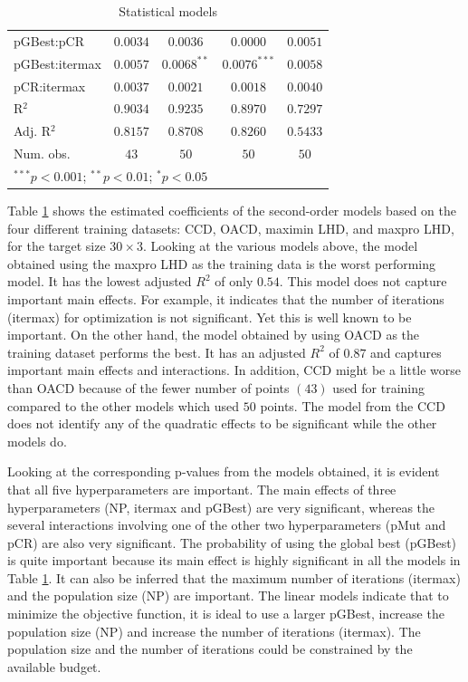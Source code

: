 \documentclass [PhD] {package/uclathes}
\begin{document}
\begin{table}
\begin{center}
\begin{tabular}{l c c c c}
pGBest:pCR     & $0.0034$        & $0.0036$        & $0.0000$        & $0.0051$        \\
pGBest:itermax & $0.0057$        & $0.0068^{**}$   & $0.0076^{***}$  & $0.0058$        \\
pCR:itermax    & $0.0037$        & $0.0021$        & $0.0018$        & $0.0040$        \\
\hline
R$^2$          & $0.9034$        & $0.9235$        & $0.8970$        & $0.7297$        \\
Adj. R$^2$     & $0.8157$        & $0.8708$        & $0.8260$        & $0.5433$        \\
Num. obs.      & $43$            & $50$            & $50$            & $50$            \\
\hline
\multicolumn{5}{l}{\scriptsize{$^{***}p<0.001$; $^{**}p<0.01$; $^{*}p<0.05$}}
\end{tabular}
\caption{Statistical models}
\label{table:coefficients}
\end{center}
\end{table}
Table \ref{table:coefficients} shows the estimated coefficients of the second-order models based on the four different training datasets: CCD, OACD, maximin LHD, and maxpro LHD, for the target size $30 \times 3$.
Looking at the various models above, the model obtained using the maxpro LHD as the training data is the worst performing model. It has the lowest adjusted $R^2$ of only $0.54$. This model does not capture important main effects. For example, it indicates that the number of iterations (itermax) for optimization is not significant. Yet this is well known to be important. On the other hand, the model obtained by using OACD as the training dataset performs the best. It has an adjusted $R^2$ of $0.87$ and captures important main effects and interactions. In addition, CCD might be a little worse than OACD because of the fewer number of points $(43)$ used for training compared to the other models which used $50$ points.
The model from the CCD does not identify any of the quadratic effects to be significant while the other models do.

Looking at the corresponding p-values from the models obtained, it is evident that all five hyperparameters are important. The main effects of three hyperparameters (NP, itermax and pGBest) are very significant, whereas the several interactions involving one of the other two hyperparameters (pMut and pCR) are also very significant.
The probability of using the global best (pGBest) is quite important because its main effect is highly significant in all the models in Table \ref{table:coefficients}. It can also be inferred that the maximum number of iterations (itermax) and the population size (NP) are important. The linear models indicate that to minimize the objective function, it is ideal to use a larger pGBest, increase the population size (NP) and increase the number of iterations (itermax). The population size and the number of iterations could be constrained by the available budget.
\end{document}
